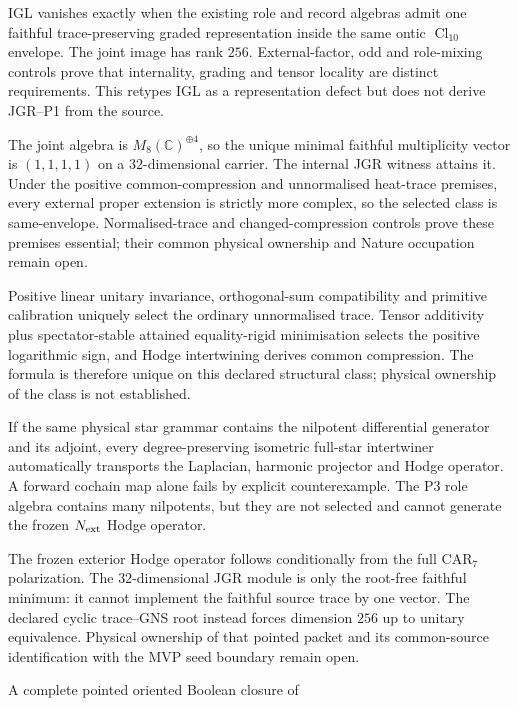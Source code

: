 \documentclass[11pt,a4paper]{article}
\theoremstyle{remark}
\begin{document}
\begin{description}
 IGL vanishes exactly when the existing role and record algebras admit one
 faithful trace-preserving graded representation inside the same ontic
 $\operatorname{Cl}_{10}$ envelope.  The joint image has rank $256$.
 External-factor, odd and role-mixing controls prove that internality,
 grading and tensor locality are distinct requirements.  This retypes IGL as
 a representation defect but does not derive JGR--P1 from the source.
 \item[Joint-carrier selection.] The joint algebra is
 $M_8(\mathbb C)^{\oplus4}$, so the unique minimal faithful multiplicity
 vector is $(1,1,1,1)$ on a $32$-dimensional carrier.  The internal JGR
 witness attains it.  Under the positive common-compression and unnormalised
 heat-trace premises, every external proper extension is strictly more
 complex, so the selected class is same-envelope.  Normalised-trace and
 changed-compression controls prove these premises essential; their common
 physical ownership and Nature occupation remain open.
 \item[Spectral-priority origin.] Positive linear unitary invariance,
 orthogonal-sum compatibility and primitive calibration uniquely select the
 ordinary unnormalised trace.  Tensor additivity plus spectator-stable
 attained equality-rigid minimisation selects the positive logarithmic sign,
 and Hodge intertwining derives common compression.  The formula is therefore
 unique on this declared structural class; physical ownership of the class is
 not established.
 \item[Dagger-functorial Hodge origin.] If the same physical star grammar
 contains the nilpotent differential generator and its adjoint, every
 degree-preserving isometric full-star intertwiner automatically transports
 the Laplacian, harmonic projector and Hodge operator.  A forward cochain map
 alone fails by explicit counterexample.  The P3 role algebra contains many
 nilpotents, but they are not selected and cannot generate the frozen
 $N_{\rm ext}$ Hodge operator.
 \item[Typed Hodge and carrier correction.] The frozen exterior Hodge
 operator follows conditionally from the full CAR$_7$ polarization.  The
 $32$-dimensional JGR module is only the root-free faithful minimum: it cannot
 implement the faithful source trace by one vector.  The declared cyclic
 trace--GNS root instead forces dimension $256$ up to unitary equivalence.
 Physical ownership of that pointed packet and its common-source
 identification with the MVP seed boundary remain open.
 \item[Seed--Boolean bridge.] A complete pointed oriented Boolean closure of

\end{description}
\end{document}
